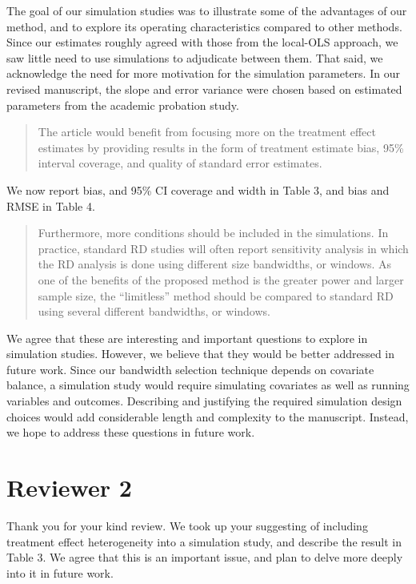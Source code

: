 \documentclass[12pt]{article}
\begin{document}
The goal of our simulation studies was to illustrate some of the
advantages of our method, and to explore its operating characteristics
compared to other methods. Since our estimates roughly agreed with
those from the local-OLS approach, we saw little need to use
simulations to adjudicate between them. That said, we acknowledge the
need for more motivation for the simulation parameters. In our revised
manuscript, the slope and error variance were chosen based on
estimated parameters from the academic probation study.

\begin{quote}
The article would benefit from focusing more on the treatment effect
estimates by providing results in the form of treatment estimate bias,
95\% interval coverage, and quality of standard error estimates.
\end{quote}
We now report bias, and 95\% CI coverage and width in Table 3, and
bias and RMSE in Table 4.

\begin{quote}
Furthermore, more conditions should be included in the simulations. In
practice, standard RD studies will often report sensitivity analysis
in which the RD analysis is done using different size bandwidths, or
windows. As one of the benefits of the proposed method is the greater
power and larger sample size, the “limitless” method should be
compared to standard RD using several different bandwidths, or
windows.
\end{quote}

We agree that these are interesting and important questions to explore
in simulation studies. However, we believe that they would be better
addressed in future work. Since our bandwidth selection technique depends on
covariate balance, a simulation study would require simulating
covariates as well as running variables and outcomes. Describing and
justifying the required simulation design choices would
add considerable length and complexity to the manuscript.
Instead, we hope to address these questions in future work.

\section{Reviewer 2}

Thank you for your kind review. We took up your suggesting of
including treatment effect heterogeneity into a simulation study,
and describe the result in Table 3. We agree that this is an important
issue, and plan to delve more deeply into it in future work.
\end{document}
